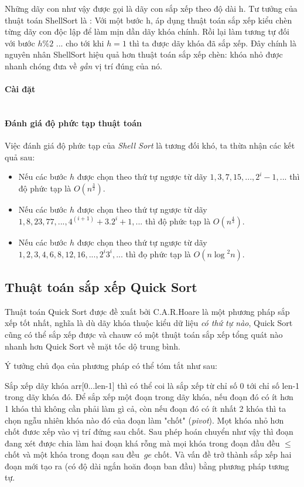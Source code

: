 \documentclass[a4paper,12pt]{report}
\newcommand{\mnt}[1]{\inputminted[frame=single, linenos=true, tabsize=4]{c++}{#1}}
\begin{document}
Những dãy con như vậy được gọi là dãy con sắp xếp theo độ dài h. Tư tưởng của thuật toán ShellSort là : Với một bước h, áp dụng thuật toán sắp xếp kiểu chèn từng dãy con độc lập để làm mịn dần dãy khóa chính. Rồi lại làm tương tự đối với bước $h \% 2$ ... cho tới khi $h = 1$ thì ta được dãy khóa đã sắp xếp.
Đây chính là nguyên nhân ShellSort hiệu quả hơn thuật toán sắp xếp chèn: khóa nhỏ được nhanh chóng đưa về \emph{gần} vị trí đúng của nó.

\paragraph{Cài đặt}
\mnt{src/shellsort.cpp}

\paragraph{Đánh giá độ phức tạp thuật toán}

Việc đánh giá độ phức tạp của \emph{Shell Sort} là tương đối khó, ta thừa nhận các kết quả sau:

\begin{itemize} 
\item Nếu các bước $h$ được chọn theo thứ tự ngược từ dãy $1, 3, 7, 15, ..., 2^i-1, ...$ thì độ phức tạp là $O(n^\frac{3}{2})$.
\item Nếu các bước $h$ được chọn theo thứ tự ngược từ dãy $1, 8, 23, 77, ..., 4^(i+1)+3.2^i + 1, ...$ thì độ phức tạp là $O(n^\frac{4}{3})$.
\item Nếu các bước $h$ được chọn theo thứ tự ngược từ dãy $1, 2, 3, 4, 6, 8, 12, 16, ..., 2^i 3^i, ...$ thì đọ phức tạp là $O(n\log{}^2n)$.
\end{itemize}



\subsection{Thuật toán sắp xếp Quick Sort}

Thuật toán Quick Sort được đề xuất bởi C.A.R.Hoare là một phương pháp sắp xếp tốt nhất, nghĩa là dù dãy khóa thuộc kiểu dữ liệu \emph{có thứ tự nào}, Quick Sort cũng có thể sắp xếp được và chauw có một thuật toán sắp xếp tổng quát nào nhanh hơn Quick Sort về mặt tốc dộ trung bình. 

Ý tưởng chủ đọa của phương pháp có thể tóm tắt như sau:

Sắp xếp dãy khóa arr[0...len-1] thì có thể coi là sắp xếp từ chỉ số 0 tới chỉ số len-1 trong dãy khóa đó. Để sắp xếp một đoạn trong dãy khóa, nếu đoạn đó có ít hơn 1 khóa thì không cần phải làm gì cả, còn nếu đoạn đó có ít nhất 2 khóa thì ta chọn ngẫu nhiên khóa nào đó của đoạn làm "chốt" (\emph{pivot}). Mọt khóa nhỏ hơn chốt đươc xếp vào vị trí đứng sau chốt. Sau phép hoán chuyển như vậy thì đoạn đang xét được chia làm hai đoạn khá rỗng mà mọi khóa trong đoạn đầu đều $ \le $ chốt và một khóa trong đoạn sau đều $\ ge $ chốt. Và vấn đề trở thành sắp xếp hai đoạn mới tạo ra (có độ dài ngắn hoăn đoạn ban đầu) bằng phương pháp tương tự.
\end{document}
